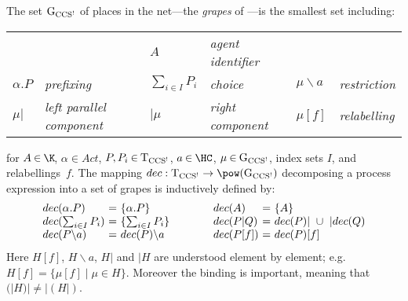 \documentclass[smallcondensed]{svjour3}
\newcommand{\T}{{\rm T}}                             \newcommand{\SC}{{\rm G}}                            \newcommand{\E}{P}                                   \newcommand{\F}{Q}                                   \newcommand{\G}{\cal G}
\newcommand{\AI}{A}                                  \newcommand{\dom}{{\it dom}}                         \makeatletter
\begin{document}
The set $\SC_{\rm CCS^!}$ of places in the net---the \emph{grapes} of \cite{DDM87}---is the smallest set including:
\vspace{-12pt}
\begin{center}
\begin{tabular}{@{}l@{~~}l@{\qquad}l@{~~}l@{\qquad}l@{~~}l@{}}
&&$\AI$ &  \emph{agent identifier}\\
$\alpha.\E$  & \emph{prefixing}&
$\sum_{i\in I}\E_i$  & \emph{choice}&
$\mu\backslash a$  & \emph{restriction}\\
$\mu|$ & \emph{left parallel component}&
$|\mu$ & \emph{right component} &
$\mu[f]$ &  \emph{relabelling} \\
\end{tabular}
\end{center}
\noindent for $\AI\mathbin\in\K\!$, $\alpha\mathbin\in Act$,
 $\E,\E_i\mathbin\in\T_{\rm CCS^!}$, $a\mathbin\in\HC $, $\mu\mathbin\in\SC_{\rm CCS^!}$, index sets $I$, and relabellings~$f$.
The mapping $dec:\T_{\rm CCS^!} \rightarrow \pow(\SC_{\rm CCS^!})$ decomposing
a process expression into a set of grapes is inductively defined by:
\[
\begin{array}{@{}l@{~=~}l@{\qquad\qquad}l@{~=~}l@{}}
dec(\alpha.P)  & \{\alpha.P\} &
dec(A) & \{ A \} \\
dec(\sum_{i\in I}\E_i) & \{ \sum_{i\in I}\E_i \} &
dec(P|Q) & dec(P)|~ \cup ~|dec(Q) \\
dec(P\backslash a) & dec(P)\backslash a &
dec(P[f]) & dec(P)[f] \\
\end{array}
\]
Here $H[f]$, $H\backslash a$, $H|$ and $|H$ are understood element by element; e.g.\
$H[f] = \{\mu[f] \mid \mu\in H\}$. Moreover the binding is important, meaning that $(|H)|\not=|(H|)$.
\end{document}
